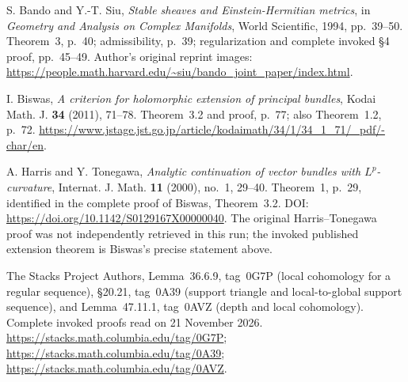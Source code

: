 S. Bando and Y.-T. Siu,
\emph{Stable sheaves and Einstein-Hermitian metrics},
in \emph{Geometry and Analysis on Complex Manifolds},
World Scientific, 1994, pp.~39--50.
Theorem~3, p.~40; admissibility, p.~39; regularization and complete
invoked \S4 proof, pp.~45--49.
Author's original reprint images:
\url{https://people.math.harvard.edu/~siu/bando_joint_paper/index.html}.

I. Biswas,
\emph{A criterion for holomorphic extension of principal bundles},
Kodai Math. J. \textbf{34} (2011), 71--78.
Theorem~3.2 and proof, p.~77; also Theorem~1.2, p.~72.
\url{https://www.jstage.jst.go.jp/article/kodaimath/34/1/34_1_71/_pdf/-char/en}.

A. Harris and Y. Tonegawa,
\emph{Analytic continuation of vector bundles with $L^p$-curvature},
Internat. J. Math. \textbf{11} (2000), no.~1, 29--40.
Theorem~1, p.~29, identified in the complete proof of
Biswas, Theorem~3.2. DOI: \url{https://doi.org/10.1142/S0129167X00000040}.
The original Harris--Tonegawa proof was not independently retrieved in
this run; the invoked published extension theorem is Biswas's precise
statement above.

The Stacks Project Authors,
Lemma~36.6.9, tag~0G7P (local cohomology for a regular sequence),
\S20.21, tag~0A39 (support triangle and local-to-global support sequence),
and Lemma~47.11.1, tag~0AVZ (depth and local cohomology).
Complete invoked proofs read on 21 November 2026.
\url{https://stacks.math.columbia.edu/tag/0G7P};
\url{https://stacks.math.columbia.edu/tag/0A39};
\url{https://stacks.math.columbia.edu/tag/0AVZ}.
